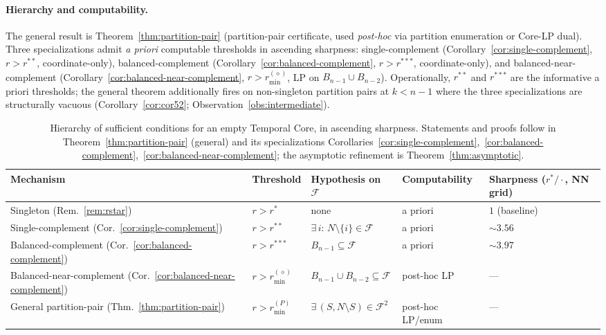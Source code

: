 \documentclass[11pt]{article}
\theoremstyle{plain}
\theoremstyle{definition}
\theoremstyle{remark}
\newcommand{\F}{\mathcal{F}}
\begin{document}
\paragraph{Hierarchy and computability.} The general result is Theorem~\ref{thm:partition-pair} (partition-pair certificate, used \emph{post-hoc} via partition enumeration or Core-LP dual). Three specializations admit \emph{a priori} computable thresholds in ascending sharpness: single-complement (Corollary~\ref{cor:single-complement}, $r>r^{\ast\ast}$, coordinate-only), balanced-complement (Corollary~\ref{cor:balanced-complement}, $r>r^{\ast\ast\ast}$, coordinate-only), and balanced-near-complement (Corollary~\ref{cor:balanced-near-complement}, $r>r^{(\diamond)}_{\min}$, LP on $B_{n-1}\cup B_{n-2}$). Operationally, $r^{\ast\ast}$ and $r^{\ast\ast\ast}$ are the informative a priori thresholds; the general theorem additionally fires on non-singleton partition pairs at $k<n-1$ where the three specializations are structurally vacuous (Corollary~\ref{cor:cor52}; Observation~\ref{obs:intermediate}).

\begin{table}[h]
\centering
\caption{Hierarchy of sufficient conditions for an empty Temporal Core, in ascending sharpness. Statements and proofs follow in Theorem~\ref{thm:partition-pair} (general) and its specializations Corollaries~\ref{cor:single-complement},~\ref{cor:balanced-complement},~\ref{cor:balanced-near-complement}; the asymptotic refinement is Theorem~\ref{thm:asymptotic}.}
\label{tab:threshold-hierarchy}
\small
\begin{tabular}{@{}lllll@{}}
\toprule
Mechanism & Threshold & Hypothesis on $\F$ & Computability & Sharpness ($r^{\ast}/\cdot$, NN grid) \\
\midrule
Singleton (Rem.~\ref{rem:rstar}) & $r > r^{\ast}$ & none & a priori & $1$ (baseline) \\
Single-complement (Cor.~\ref{cor:single-complement}) & $r > r^{\ast\ast}$ & $\exists\, i:\, N\setminus\{i\}\in\F$ & a priori & $\sim 3.56$ \\
Balanced-complement (Cor.~\ref{cor:balanced-complement}) & $r > r^{\ast\ast\ast}$ & $B_{n-1}\subseteq\F$ & a priori & $\sim 3.97$ \\
Balanced-near-complement (Cor.~\ref{cor:balanced-near-complement}) & $r > r^{(\diamond)}_{\min}$ & $B_{n-1}\cup B_{n-2}\subseteq\F$ & post-hoc LP & --- \\
General partition-pair (Thm.~\ref{thm:partition-pair}) & $r > r^{(P)}_{\min}$ & $\exists\,(S,N\setminus S)\in\F^{2}$ & post-hoc LP/enum & --- \\
\bottomrule
\end{tabular}
\end{table}
\end{document}
